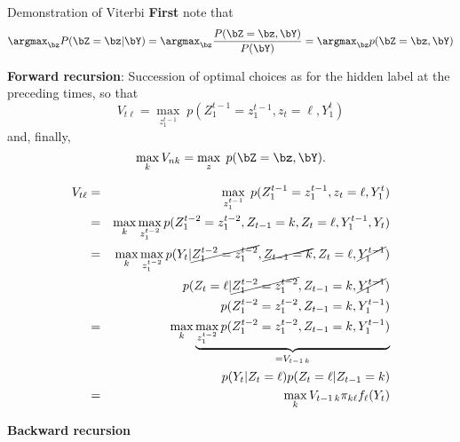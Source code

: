 \documentclass[compress,10pt]{beamer}
\begin{document}
 

\begin{frame}[allowframebreaks]{Demonstration of Viterbi}
\textbf{First} note that $$
\argmax_\bz P(\bZ=\bz |\bY) = \argmax_\bz \frac{P(\bZ=\bz, \bY)}{P(\bY)} = \argmax_\bz p(\bZ=\bz, \bY)
$$


\textbf{Forward recursion}: Succession of optimal choices as for the hidden label at the preceding times, so that 
$$
V_{t\ell} = \max_{z_1^{t-1}} \; p(Z_1^{t-1} = z_1^{t-1}, z_t = \ell, Y_1^t)
$$
and, finally, 
$$
\max_k V_{nk} = \max_z \; p(\bZ=\bz, \bY).
$$


\begin{eqnarray*}
V_{t\ell} &=& \max_{z_1^{t-1}} \; p(Z_1^{t-1} = z_1^{t-1}, z_t = \ell, Y_1^t)\\
&=&   \max_{k} \max_{z_1^{t-2}} p(Z_1^{t-2} = z_1^{t-2}, Z_{t-1}=k,  Z_t = \ell, Y_1^{t-1}, Y_{t})\\
&=&   \max_{k} \max_{z_1^{t-2}} p(Y_{t} | \cancel{Z_1^{t-2} = z_1^{t-2}}, \cancel{Z_{t-1}=k},  Z_t = \ell, \cancel{Y_1^{t-1}})\\
&& \quad \quad  \quad \quad  \quad p(Z_t = \ell | \cancel{Z_1^{t-2} = z_1^{t-2}}, Z_{t-1}=k,  \cancel{Y_1^{t-1}}) \\
&&  \quad \quad  \quad \quad  \quad p(Z_1^{t-2} = z_1^{t-2}, Z_{t-1}=k,   Y_1^{t-1})\\
&=& \max_{k} \underbrace{\max_{z_1^{t-2}} p(Z_1^{t-2} = z_1^{t-2}, Z_{t-1}=k, Y_1^{t-1})}_{=V_{t-1\, k}}\\
&& p(Y_{t} | Z_t = \ell) p( Z_t = \ell | Z_{t-1}=k) \\
&=& \max_{k} V_{t-1\, k} \pi_{k\ell} f_\ell(Y_t)
\end{eqnarray*}


\textbf{Backward recursion}
 

\end{frame}
\end{document}
